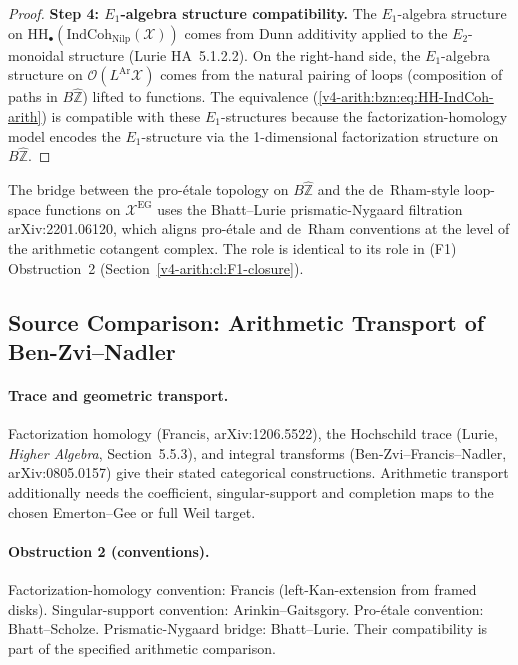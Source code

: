 \begin{proof}
\medskip\noindent\textbf{Step 4: \(E_{1}\)-algebra structure compatibility.}
The \(E_{1}\)-algebra structure on
\(\mathrm{HH}_{\bullet}(\mathrm{IndCoh}_{\mathrm{Nilp}}(\mathcal{X}))\)
comes from Dunn additivity applied to the \(E_{2}\)-monoidal structure
(Lurie HA~5.1.2.2). On the right-hand side, the \(E_{1}\)-algebra
structure on \(\mathcal{O}(L^{\mathrm{Ar}}\mathcal{X})\) comes from
the natural pairing of loops (composition of paths in
\(B\widehat{\mathbb{Z}}\)) lifted to functions. The equivalence
(\ref{v4-arith:bzn:eq:HH-IndCoh-arith}) is compatible with
these \(E_{1}\)-structures because the factorization-homology
model encodes the \(E_{1}\)-structure via the 1-dimensional
factorization structure on \(B\widehat{\mathbb{Z}}\).
\end{proof}

\begin{remark}
\label{v4-arith:bzn:rem:prismatic-convention}
The bridge between the pro-\'etale topology on \(B\widehat{\mathbb{Z}}\)
and the de~Rham-style loop-space functions on \(\mathcal{X}^{\mathrm{EG}}\)
uses the Bhatt--Lurie prismatic-Nygaard filtration arXiv:2201.06120,
which aligns pro-\'etale and de~Rham conventions at the level
of the arithmetic cotangent complex. The role is identical to
its role in (F1) Obstruction~2 (Section~\ref{v4-arith:cl:F1-closure}).
\end{remark}

\subsection{Source Comparison: Arithmetic Transport of Ben-Zvi--Nadler}

\paragraph{Trace and geometric transport.} Factorization homology
(Francis, arXiv:1206.5522), the Hochschild trace (Lurie,
\emph{Higher Algebra}, Section~5.5.3), and integral transforms
(Ben-Zvi--Francis--Nadler, arXiv:0805.0157) give their stated
categorical constructions. Arithmetic transport additionally needs
the coefficient, singular-support and completion maps to the chosen
Emerton--Gee or full Weil target.

\paragraph{Obstruction 2 (conventions).} Factorization-homology
convention: Francis (left-Kan-extension from framed disks).
Singular-support convention: Arinkin--Gaitsgory. Pro-\'etale
convention: Bhatt--Scholze. Prismatic-Nygaard bridge: Bhatt--Lurie.
Their compatibility is part of the specified arithmetic comparison.

